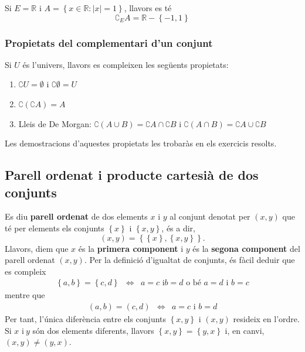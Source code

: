 \begin{exemple}
Si $E=\mathbb{R}$ i $A=\left\{ x\in\mathbb{R}:\left\vert x\right\vert
=1\right\} $, llavors es té%
\begin{equation*}
\complement_{E}A=\mathbb{R}-\left\{ -1,1\right\}
\end{equation*}
\end{exemple}

\subsubsection{Propietats del complementari d'un conjunt}

Si $U$ és l'univers, llavors es compleixen les següents propietats:

\begin{enumerate}
\item $\complement U=\emptyset$ i $\complement\emptyset=U$

\item $\complement\left( \complement A\right) =A$

\item Lleis de De Morgan: $\complement\left( A\cup B\right) =\complement
A\cap\complement B$ i $\complement\left( A\cap B\right) =\complement
A\cup\complement B$
\end{enumerate}

Les demostracions d'aquestes propietats les trobaràs en els exercicis
resolts.

\subsection{Parell ordenat i producte cartesià de dos conjunts}

Es diu \textbf{parell ordenat} de dos elements $x$ i $y$ al conjunt denotat
per $(x,y)$ que té per elements els conjunts $\left\{ x\right\} $ i $
\left\{ x,y\right\} $, és a dir,%
\begin{equation*}
(x,y)=\left\{ \left\{ x\right\} ,\left\{ x,y\right\} \right\} \text{.}
\end{equation*}
Llavors, diem que $x$ és la \textbf{primera component} i $y$ és la
\textbf{segona component} del parell ordenat $(x,y)$. Per la definició
d'igualtat de conjunts, és fàcil deduir que es compleix%
\begin{equation*}
\begin{array}{ccc}
\left\{ a,b\right\} =\left\{ c,d\right\} & \Longleftrightarrow & a=c\text{ i
}b=d\text{ o bé }a=d\text{ i }b=c%
\end{array}
\end{equation*}
mentre que%
\begin{equation*}
\begin{array}{ccc}
(a,b)=(c,d) & \Longleftrightarrow & a=c\text{ i }b=d%
\end{array}
\end{equation*}
Per tant, l'única diferència entre els conjunts $\left\{ x,y\right\}
$ i $(x,y)$ resideix en l'ordre. Si $x$ i$\ y$ són dos elements
diferents, llavors $\left\{ x,y\right\} =\left\{ y,x\right\} $ i, en canvi, $%
(x,y)\neq(y,x)$.

